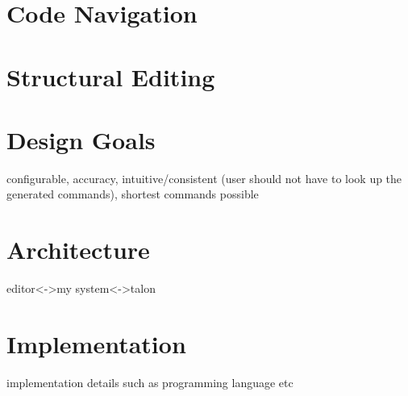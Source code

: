 \documentclass[../thesis.tex]{subfiles}
\begin{document}
\section{Code Navigation}%
\label{sec:code_navigation}

\section{Structural Editing}%
\label{sec:structural_editing}

\section{Design Goals}%
\label{sec:design_goals}
configurable, accuracy, intuitive/consistent (user should not have to look up the generated commands), 
shortest commands possible

\section{Architecture}%
\label{sec:architecture}
editor<->my system<->talon

\section{Implementation}%
\label{sec:implementation}
implementation details such as programming language etc
\end{document}
